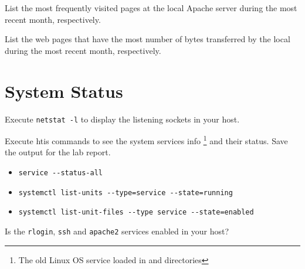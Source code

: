 \documentclass{../UTNetLab}
\begin{document}
    \begin{report}
    \item List the most frequently visited pages at the local Apache server during the most recent month, respectively.
    
    \item List the web pages that have the most number of bytes transferred by the local during the most recent month, respectively.
    \end{report}

\section{System Status}
    Execute \lstinline{netstat -l} to display the listening sockets in your host.

    Execute htis commands to see the system services info \footnote{The old Linux OS service loaded in and  directories} and their status.
    Save the output for the lab report.
    \begin{itemize}
        \item \lstinline{service --status-all}
        \item \lstinline{systemctl list-units --type=service --state=running}
        \item \lstinline{systemctl list-unit-files --type service --state=enabled}
    \end{itemize}
    
    \begin{report}
    \item Is the \lstinline{rlogin}, \lstinline{ssh} and \lstinline{apache2} services enabled in your host?
    \end{report}
\end{document}

